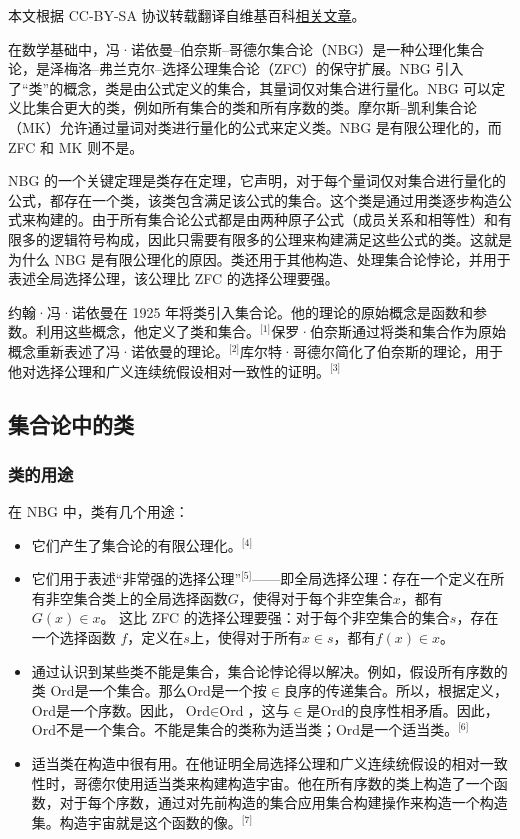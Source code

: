 
本文根据 CC-BY-SA 协议转载翻译自维基百科\href{https://en.wikipedia.org/wiki/Von_Neumann\%E2\%80\%93Bernays\%E2\%80\%93G\%C3\%B6del_set_theory}{相关文章}。

在数学基础中，冯·诺依曼–伯奈斯–哥德尔集合论（NBG）是一种公理化集合论，是泽梅洛–弗兰克尔–选择公理集合论（ZFC）的保守扩展。NBG 引入了“类”的概念，类是由公式定义的集合，其量词仅对集合进行量化。NBG 可以定义比集合更大的类，例如所有集合的类和所有序数的类。摩尔斯–凯利集合论（MK）允许通过量词对类进行量化的公式来定义类。NBG 是有限公理化的，而 ZFC 和 MK 则不是。

NBG 的一个关键定理是类存在定理，它声明，对于每个量词仅对集合进行量化的公式，都存在一个类，该类包含满足该公式的集合。这个类是通过用类逐步构造公式来构建的。由于所有集合论公式都是由两种原子公式（成员关系和相等性）和有限多的逻辑符号构成，因此只需要有限多的公理来构建满足这些公式的类。这就是为什么 NBG 是有限公理化的原因。类还用于其他构造、处理集合论悖论，并用于表述全局选择公理，该公理比 ZFC 的选择公理要强。

约翰·冯·诺依曼在 1925 年将类引入集合论。他的理论的原始概念是函数和参数。利用这些概念，他定义了类和集合。\(^\text{[1]}\)保罗·伯奈斯通过将类和集合作为原始概念重新表述了冯·诺依曼的理论。\(^\text{[2]}\)库尔特·哥德尔简化了伯奈斯的理论，用于他对选择公理和广义连续统假设相对一致性的证明。\(^\text{[3]}\)
\subsection{集合论中的类} 
\subsubsection{类的用途} 
在 NBG 中，类有几个用途：
\begin{itemize}
\item 它们产生了集合论的有限公理化。\(^\text{[4]}\)  
\item 它们用于表述“非常强的选择公理”\(^\text{[5]}\)——即全局选择公理：存在一个定义在所有非空集合类上的全局选择函数\( G \)，使得对于每个非空集合\( x \)，都有 \( G(x) \in x \)。  
   这比 ZFC 的选择公理要强：对于每个非空集合的集合\( s \)，存在一个选择函数 \( f \)，定义在\( s \)上，使得对于所有\( x \in s \)，都有\( f(x) \in x \)。  
\item 通过认识到某些类不能是集合，集合论悖论得以解决。例如，假设所有序数的类 \( \text{Ord} \)是一个集合。那么\( \text{Ord} \)是一个按\( \in \)良序的传递集合。所以，根据定义，\( \text{Ord} \)是一个序数。因此，\( \text{Ord} \in \text{Ord} \)，这与\( \in \)是\( \text{Ord} \)的良序性相矛盾。因此，\( \text{Ord} \)不是一个集合。不能是集合的类称为适当类；\( \text{Ord} \)是一个适当类。\(^\text{[6]}\)
\item 适当类在构造中很有用。在他证明全局选择公理和广义连续统假设的相对一致性时，哥德尔使用适当类来构建构造宇宙。他在所有序数的类上构造了一个函数，对于每个序数，通过对先前构造的集合应用集合构建操作来构造一个构造集。构造宇宙就是这个函数的像。\(^\text{[7]}\)
\end{itemize}
